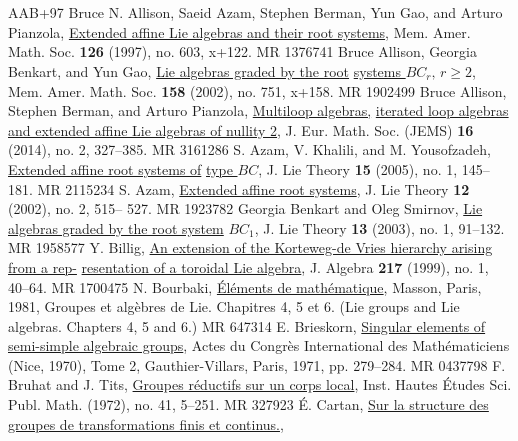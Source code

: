 \documentclass[11pt]{amsart}
\begin{document}
{%
\part*{}
\begin{thebibliography}{AAB+97}
Bruce N. Allison, Saeid Azam, Stephen Berman, Yun Gao, and Arturo Pianzola, 
\underline{Extended affine Lie algebras and their root systems}, Mem. Amer. Math. Soc. 
{\bf 126} (1997), no. 603, x+122. MR 1376741
Bruce Allison, Georgia Benkart, and Yun Gao, 
\underline{Lie algebras graded by the root}
\underline{systems $BC_r,\, r\geq 2$}, Mem. Amer. Math. Soc. 
{\bf 158} (2002), no. 751, x+158. MR 1902499
Bruce Allison, Stephen Berman, and Arturo Pianzola, 
\underline{Multiloop algebras,} 
\underline{iterated loop algebras and extended affine Lie algebras of nullity 2}, 
J. Eur. Math. Soc. (JEMS) {\bf 16} (2014), no. 2, 327–385. MR 3161286
S. Azam, V. Khalili, and M. Yousofzadeh, 
\underline{Extended affine root systems of} \underline{type $BC$}, 
J. Lie Theory {\bf 15} (2005), no. 1, 145–181. 
MR 2115234
S. Azam, 
\underline{Extended affine root systems}, 
J. Lie Theory {\bf 12} (2002), no. 2, 515– 527. MR 1923782
Georgia Benkart and Oleg Smirnov, 
\underline{Lie algebras graded by the root system}
\underline{$BC_1$}, 
J. Lie Theory {\bf 13} (2003), no. 1, 91–132. MR 1958577
Y. Billig, 
\underline{An extension of the Korteweg-de Vries hierarchy arising from a rep-}
\underline{resentation of a toroidal Lie algebra}, 
J. Algebra {\bf 217} (1999), no. 1, 40–64. MR 1700475
N. Bourbaki,
\underline{\'{E}l\'{e}ments de math\'{e}matique}, 
Masson, Paris, 1981, Groupes et alg\`{e}bres de Lie. Chapitres 4, 5 et 6. 
(Lie groups and Lie algebras. Chapters 4, 5 and 6.) MR 647314
E. Brieskorn, 
\underline{Singular elements of semi-simple algebraic groups}, 
Actes du Congr\`{e}s International des Math\'{e}maticiens (Nice, 1970), 
Tome 2, Gauthier-Villars, Paris, 1971, pp. 279–284. MR 0437798
F. Bruhat and J. Tits, 
\underline{Groupes r\'{e}ductifs sur un corps local}, 
Inst. Hautes \'{E}tudes Sci. Publ. Math. (1972), no. 41, 5–251. MR 327923
\'{E}. Cartan, 
\underline{Sur la structure des groupes de transformations finis et continus.}, 

\end{thebibliography}}
\end{document}
